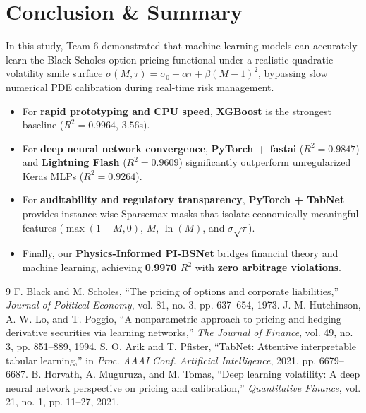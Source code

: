 \documentclass[10pt,twocolumn]{article}
\begin{document}
\section{Conclusion \& Summary}
In this study, Team 6 demonstrated that machine learning models can accurately learn the Black-Scholes option pricing functional under a realistic quadratic volatility smile surface $\sigma(M,\tau) = \sigma_0 + \alpha\tau + \beta(M-1)^2$, bypassing slow numerical PDE calibration during real-time risk management.
\begin{itemize}
    \item For \textbf{rapid prototyping and CPU speed}, \textbf{XGBoost} is the strongest baseline ($R^2 = 0.9964$, $3.56$s).
    \item For \textbf{deep neural network convergence}, \textbf{PyTorch + fastai} ($R^2 = 0.9847$) and \textbf{Lightning Flash} ($R^2 = 0.9609$) significantly outperform unregularized Keras MLPs ($R^2 = 0.9264$).
    \item For \textbf{auditability and regulatory transparency}, \textbf{PyTorch + TabNet} provides instance-wise Sparsemax masks that isolate economically meaningful features ($\max(1-M,0)$, $M$, $\ln(M)$, and $\sigma\sqrt{\tau}$).
    \item Finally, our \textbf{Physics-Informed PI-BSNet} bridges financial theory and machine learning, achieving \textbf{0.9970 $R^2$} with \textbf{zero arbitrage violations}.
\end{itemize}

\begin{thebibliography}{9}
\footnotesize
{} F. Black and M. Scholes, ``The pricing of options and corporate liabilities,'' \textit{Journal of Political Economy}, vol. 81, no. 3, pp. 637--654, 1973.
 J. M. Hutchinson, A. W. Lo, and T. Poggio, ``A nonparametric approach to pricing and hedging derivative securities via learning networks,'' \textit{The Journal of Finance}, vol. 49, no. 3, pp. 851--889, 1994.
 S. O. Arik and T. Pfister, ``TabNet: Attentive interpretable tabular learning,'' in \textit{Proc. AAAI Conf. Artificial Intelligence}, 2021, pp. 6679--6687.
 B. Horvath, A. Muguruza, and M. Tomas, ``Deep learning volatility: A deep neural network perspective on pricing and calibration,'' \textit{Quantitative Finance}, vol. 21, no. 1, pp. 11--27, 2021.
\end{thebibliography}
\end{document}
